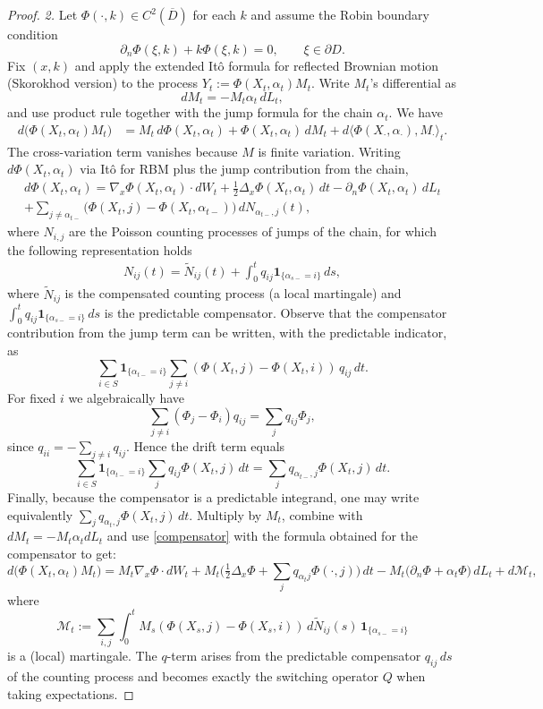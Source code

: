 \documentclass[11pt]{amsart}
\theoremstyle{plain}
\theoremstyle{definition}
\theoremstyle{remark}
\begin{document}
\begin{proof}
	\emph{2.} Let $\Phi(\cdot,k)\in C^2(\overline D)$ for each $k$ and assume the Robin boundary condition
	\[
	\partial_n\Phi(\xi,k)+k\Phi(\xi,k)=0,\qquad \xi\in\partial D.
	\]
	Fix \((x,k)\) and apply the extended It\^o formula for reflected Brownian motion (Skorokhod version) to the process $Y_t:=\Phi(X_t,\alpha_t) M_t$. Write $M_t$'s differential as
	\[
	dM_t = -M_t \alpha_t\,dL_t,
	\]
	and use product rule together with the jump formula for the chain \(\alpha_t\). We have
	\begin{align*}
		d\big(\Phi(X_t,\alpha_t) M_t\big)
		&= M_t\,d\Phi(X_t,\alpha_t) + \Phi(X_t,\alpha_t)\,dM_t + d\langle \Phi(X_\cdot,\alpha_\cdot),M_\cdot\rangle_t.
	\end{align*}
	The cross-variation term vanishes because $M$ is finite variation. Writing $d\Phi(X_t,\alpha_t)$ via It\^o for RBM plus the jump contribution from the chain,
	\begin{multline*}
		d\Phi(X_t,\alpha_t)
		= \nabla_x\Phi(X_t,\alpha_t)\cdot dW_t + \tfrac12\Delta_x\Phi(X_t,\alpha_t)\,dt
		- \partial_n\Phi(X_t,\alpha_t)\,dL_t \\
		+ \sum_{j\ne\alpha_{t-}} \big(\Phi(X_t,j)-\Phi(X_t,\alpha_{t-})\big)\,dN_{\alpha_{t-},j}(t),
	\end{multline*}
	where $N_{i,j}$ are the Poisson counting processes of jumps of the chain, for which the following representation holds
	\begin{align}
		\label{compensator}
		N_{ij}(t) = \widetilde N_{ij}(t) + \int_0^t q_{ij}\mathbf1_{\{\alpha_{s-}=i\}}\,ds,
	\end{align}
	where $\widetilde N_{ij}$ is the compensated counting process (a local martingale) and $\int_0^t q_{ij}\mathbf1_{\{\alpha_{s-}=i\}}\,ds$ is the predictable compensator.
	Observe that the compensator contribution from the jump term can be written, with the predictable indicator, as
	\[
	\sum_{i\in S}\mathbf1_{\{\alpha_{t-}=i\}}\sum_{j\ne i}(\Phi(X_t,j)-\Phi(X_t,i))\,q_{ij}\,dt.
	\]
	For fixed $i$ we algebraically have
	\[
	\sum_{j\ne i}(\Phi_j-\Phi_i)q_{ij}=\sum_{j}q_{ij}\Phi_j,
	\]
	since $q_{ii}=-\sum_{j\ne i}q_{ij}$. Hence the drift term equals
	\[
	\sum_{i\in S}\mathbf1_{\{\alpha_{t-}=i\}}\sum_j q_{ij}\Phi(X_t,j)\,dt
	= \sum_j q_{\alpha_{t-},j}\Phi(X_t,j)\,dt.
	\]
	Finally, because the compensator is a predictable integrand, one may write equivalently \(\sum_j q_{\alpha_t,j}\Phi(X_t,j)\,dt\).
	Multiply by $M_t$, combine with $dM_t=-M_t\alpha_t dL_t$ and use \eqref{compensator} with the formula obtained for the compensator to get:
	\[
	d\big(\Phi(X_t,\alpha_t)M_t\big)
	= M_t\nabla_x\Phi\cdot dW_t + M_t\Big(\tfrac12\Delta_x\Phi + \sum_j q_{\alpha_t j}\Phi(\cdot,j)\Big)\,dt
	- M_t\big(\partial_n\Phi +\alpha_t\Phi\big)\,dL_t + d\mathcal M_t,
	\]
	where
	\[
	\mathcal M_t := \sum_{i,j}\int_0^t M_s(\Phi(X_s,j)-\Phi(X_s,i))\,d\widetilde N_{ij}(s)\,\mathbf1_{\{\alpha_{s-}=i\}}
	\]
	is a (local) martingale. The \(q\)-term arises from the predictable compensator \(q_{ij}\,ds\) of the counting process and becomes exactly the switching operator \(Q\) when taking expectations.
	

\end{proof}
\end{document}

